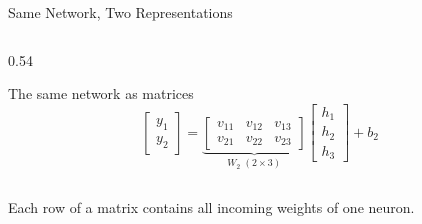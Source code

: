 \documentclass[aspectratio=169]{beamer}
\begin{document}
\begin{frame}{Same Network, Two Representations}
\begin{columns}[T]
\begin{column}{0.54\textwidth}
\begin{block}{The same network as matrices}
        \begin{equation*}
          \begin{bmatrix}y_1 \\ y_2\end{bmatrix}
          =
          \underbrace{
            \begin{bmatrix}
              v_{11} & v_{12} & v_{13} \\
              v_{21} & v_{22} & v_{23}
            \end{bmatrix}
          }_{W_2\; (2 \times 3)}
          \begin{bmatrix}h_1 \\ h_2 \\ h_3\end{bmatrix}
          + b_2
        \end{equation*}
      \end{block}
    \end{column}
  \end{columns}

  Each row of a matrix contains all incoming weights of one neuron.
\end{frame}
\end{document}
